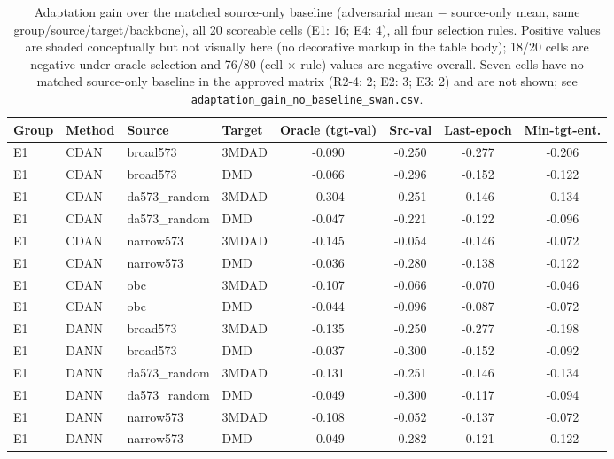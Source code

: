 \begin{table}[t]
\centering
\caption{Adaptation gain over the matched source-only baseline (adversarial mean $-$ source-only mean, same group/source/target/backbone), all 20 scoreable cells (E1: 16; E4: 4), all four selection rules. Positive values are shaded conceptually but not visually here (no decorative markup in the table body); 18/20 cells are negative under oracle selection and 76/80 (cell $\times$ rule) values are negative overall. Seven cells have no matched source-only baseline in the approved matrix (R2-4: 2; E2: 3; E3: 2) and are not shown; see \texttt{adaptation\_gain\_no\_baseline\_swan.csv}.}
\label{tab:adaptation_gain}
\footnotesize
\setlength{\tabcolsep}{3pt}
\begin{tabular}{llllcccc}
\toprule
Group & Method & Source & Target & Oracle (tgt-val) & Src-val & Last-epoch & Min-tgt-ent. \\
\midrule
E1 & CDAN & broad573 & 3MDAD & -0.090 & -0.250 & -0.277 & -0.206 \\
E1 & CDAN & broad573 & DMD & -0.066 & -0.296 & -0.152 & -0.122 \\
E1 & CDAN & da573\_random & 3MDAD & -0.304 & -0.251 & -0.146 & -0.134 \\
E1 & CDAN & da573\_random & DMD & -0.047 & -0.221 & -0.122 & -0.096 \\
E1 & CDAN & narrow573 & 3MDAD & -0.145 & -0.054 & -0.146 & -0.072 \\
E1 & CDAN & narrow573 & DMD & -0.036 & -0.280 & -0.138 & -0.122 \\
E1 & CDAN & obc & 3MDAD & -0.107 & -0.066 & -0.070 & -0.046 \\
E1 & CDAN & obc & DMD & -0.044 & -0.096 & -0.087 & -0.072 \\
E1 & DANN & broad573 & 3MDAD & -0.135 & -0.250 & -0.277 & -0.198 \\
E1 & DANN & broad573 & DMD & -0.037 & -0.300 & -0.152 & -0.092 \\
E1 & DANN & da573\_random & 3MDAD & -0.131 & -0.251 & -0.146 & -0.134 \\
E1 & DANN & da573\_random & DMD & -0.049 & -0.300 & -0.117 & -0.094 \\
E1 & DANN & narrow573 & 3MDAD & -0.108 & -0.052 & -0.137 & -0.072 \\
E1 & DANN & narrow573 & DMD & -0.049 & -0.282 & -0.121 & -0.122 \\

\end{tabular}
\end{table}
